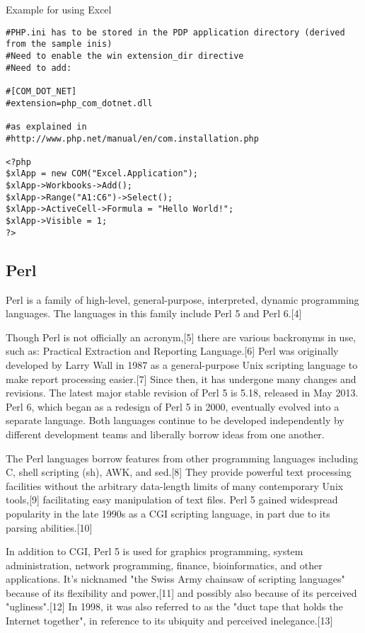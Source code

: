 \vpara
Example for using Excel

\begin{lstlisting}
#PHP.ini has to be stored in the PDP application directory (derived from the sample inis)
#Need to enable the win extension_dir directive
#Need to add:

#[COM_DOT_NET]
#extension=php_com_dotnet.dll

#as explained in 
#http://www.php.net/manual/en/com.installation.php

<?php
$xlApp = new COM("Excel.Application");
$xlApp->Workbooks->Add();
$xlApp->Range("A1:C6")->Select();
$xlApp->ActiveCell->Formula = "Hello World!";
$xlApp->Visible = 1;
?>
\end{lstlisting}




\newpage
\subsection{Perl}
Perl is a family of high-level, general-purpose, interpreted, dynamic programming languages. The languages in this family include Perl 5 and Perl 6.[4]

\vpara
Though Perl is not officially an acronym,[5] there are various backronyms in use, such as: Practical Extraction and Reporting Language.[6] Perl was originally developed by Larry Wall in 1987 as a general-purpose Unix scripting language to make report processing easier.[7] Since then, it has undergone many changes and revisions. The latest major stable revision of Perl 5 is 5.18, released in May 2013. Perl 6, which began as a redesign of Perl 5 in 2000, eventually evolved into a separate language. Both languages continue to be developed independently by different development teams and liberally borrow ideas from one another.

\vpara
The Perl languages borrow features from other programming languages including C, shell scripting (sh), AWK, and sed.[8] They provide powerful text processing facilities without the arbitrary data-length limits of many contemporary Unix tools,[9] facilitating easy manipulation of text files. Perl 5 gained widespread popularity in the late 1990s as a CGI scripting language, in part due to its parsing abilities.[10]

\vpara
In addition to CGI, Perl 5 is used for graphics programming, system administration, network programming, finance, bioinformatics, and other applications. It's nicknamed "the Swiss Army chainsaw of scripting languages" because of its flexibility and power,[11] and possibly also because of its perceived "ugliness".[12] In 1998, it was also referred to as the "duct tape that holds the Internet together", in reference to its ubiquity and perceived inelegance.[13]

